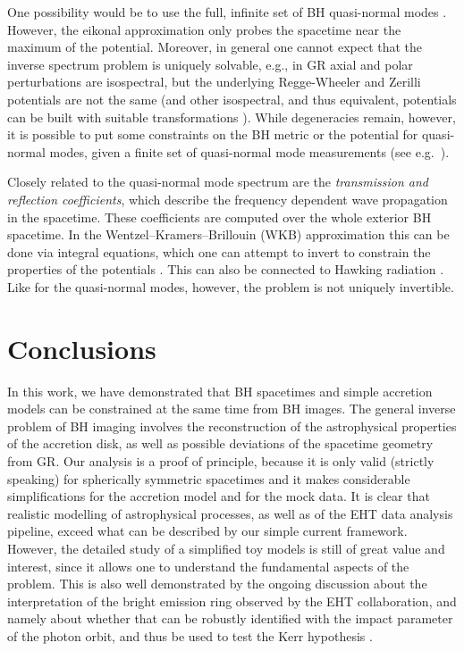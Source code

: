 \documentclass[%
nofootinbib,
 amsmath,amssymb,
 aps,
floatfix,
twocolumn
]{revtex4-2}
\begin{document}
One possibility would be to use the full, infinite set of BH quasi-normal modes \cite{Kokkotas:1999bd,Nollert_1999,Berti_2009}. However, the  eikonal approximation only probes the spacetime near the maximum of the potential. Moreover, 
in general one cannot expect that the inverse spectrum problem is uniquely solvable, e.g., in GR axial and polar perturbations are isospectral,  but the underlying Regge-Wheeler and Zerilli potentials are not the same (and other isospectral, and thus equivalent, potentials can be built with suitable transformations \cite{Chandrasekhar:1985kt,Glampedakis:2017rar}).
While degeneracies remain, however, it is possible to put some constraints on the BH metric or the potential for quasi-normal modes,
given a finite set of quasi-normal mode measurements (see e.g.~\cite{paper8,paper10}). 

Closely related to the quasi-normal mode spectrum 
are the \textit{transmission and reflection coefficients}, which describe the frequency dependent wave propagation in the spacetime. These coefficients are computed over the whole exterior BH spacetime. 
In the Wentzel–Kramers–Brillouin (WKB) approximation \cite{1978amms.book.....B} this can be done via integral equations, which one can attempt to invert to constrain the properties of the potentials \cite{Cole:1978zz,Lazenby:1980se,doi:10.1119/1.2190683}. This can also be connected to Hawking radiation \cite{Volkel:2019ahb}. Like for the quasi-normal modes, however, the problem is not uniquely invertible.

\section{Conclusions}\label{conclusions}

In this work, we have demonstrated that BH spacetimes and simple accretion models can be constrained at the same time from BH images. The general inverse problem of BH imaging involves the reconstruction of the astrophysical properties of the accretion disk, as well as possible deviations of the spacetime geometry from GR. Our analysis is a proof of principle, because it is only valid (strictly speaking) for spherically symmetric spacetimes and it makes considerable simplifications for the accretion model and for the mock data. It is clear that realistic modelling of astrophysical processes, as well as of the EHT data analysis pipeline, exceed what can be described by our simple current framework. However, the detailed study of a simplified toy models is still of great value and interest, since it allows one to understand the fundamental aspects of the problem. This is also well demonstrated by the ongoing discussion about the interpretation of the bright emission ring observed by the EHT collaboration, and namely about whether that can be robustly identified with the impact parameter of the photon orbit, and thus be used to  test  the Kerr hypothesis \cite{PhysRevLett.125.141104,Gralla:2020pra,Kocherlakota:2021dcv,Volkel:2020xlc,Glampedakis:2021oie}.
\end{document}
